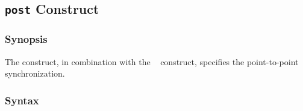 %
%
%
%
%
%
%
%
%


\subsection{{\tt post} Construct}

\subsubsection*{Synopsis}

The {\tt {}} construct, in combination with the {\tt
{}} construct, specifies the point-to-point
synchronization.

\subsubsection*{Syntax}

